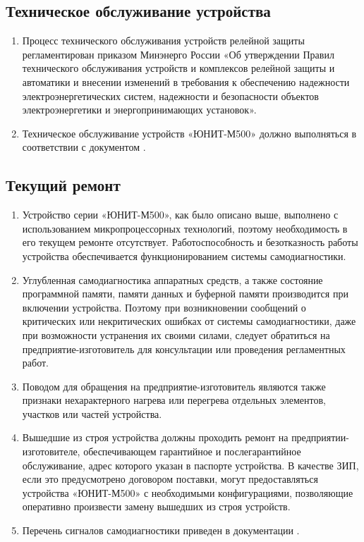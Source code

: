 {\color{unimain}\subsection{Техническое обслуживание устройства}}
\begin{enumerate}
\item \sloppy Процесс технического обслуживания устройств релейной защиты регламентирован приказом Минэнерго России «Об утверждении Правил технического обслуживания устройств и комплексов релейной защиты и автоматики и внесении изменений в требования к обеспечению надежности электроэнергетических систем, надежности и безопасности объектов электроэнергетики и энергопринимающих установок».
\item Техническое обслуживание устройств «ЮНИТ-М500» должно выполняться в соответствии с документом \ManualUnitMU.
\end{enumerate}

{\color{unimain}\subsection{Текущий ремонт}}
\begin{enumerate}
\item Устройство серии «ЮНИТ-М500», как было описано выше, выполнено с использованием микропроцессорных технологий, поэтому необходимость в его текущем ремонте отсутствует. Работоспособность и безотказность работы устройства обеспечивается функционированием системы самодиагностики.
\item Углубленная самодиагностика аппаратных средств, а также состояние программной памяти, памяти данных и буферной памяти производится при включении устройства. Поэтому при возникновении сообщений о критических или некритических ошибках от системы самодиагностики, даже при возможности устранения их своими силами, следует обратиться на предприятие-изготовитель для консультации или проведения регламентных работ.
\item Поводом для обращения на предприятие-изготовитель являются также признаки нехарактерного нагрева или перегрева отдельных элементов, участков или частей устройства.
\item Вышедшие из строя устройства должны проходить ремонт на предприятии-изготовителе, обеспечивающем гарантийное и послегарантийное обслуживание, адрес которого указан в паспорте устройства. В качестве ЗИП, если это предусмотрено договором поставки, могут предоставляться устройства «ЮНИТ-М500» с необходимыми конфигурациями, позволяющие оперативно произвести замену вышедших из строя устройств.
\item Перечень сигналов самодиагностики приведен в документации \ManualUnitGeneral.
\end{enumerate}

